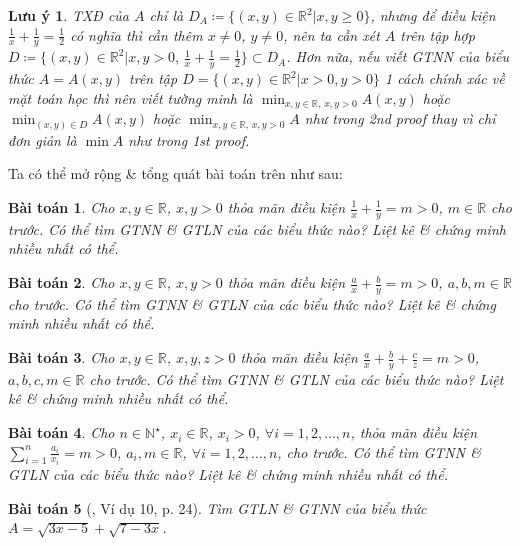 \documentclass{article}
\newtheorem{baitoan}{Bài toán}
\newtheorem{luuy}{Lưu ý}
\begin{document}
\begin{luuy}
	TXĐ của $A$ chỉ là $D_A\coloneqq\{(x,y)\in\mathbb{R}^2|x,y\ge0\}$, nhưng để điều kiện $\frac{1}{x} + \frac{1}{y} = \frac{1}{2}$ có nghĩa thì cần thêm $x\ne0$, $y\ne0$, nên ta cần xét $A$ trên tập hợp $D\coloneqq\{(x,y)\in\mathbb{R}^2|x,y > 0,\,\frac{1}{x} + \frac{1}{y} = \frac{1}{2}\}\subset D_A$. Hơn nữa, nếu viết {\rm GTNN} của biểu thức $A = A(x,y)$ trên tập $D = \{(x,y)\in\mathbb{R}^2|x > 0,y > 0\}$ 1 cách chính xác về mặt toán học thì nên viết tường minh là $\min_{x,y\in\mathbb{R},\,x,y > 0} A(x,y)$ hoặc $\min_{(x,y)\in D} A(x,y)$ hoặc $\min_{x,y\in\mathbb{R},\,x,y > 0} A$ như trong 2nd proof thay vì chỉ đơn giản là $\min A$ như trong 1st proof.
\end{luuy}
Ta có thể mở rộng \& tổng quát bài toán trên như sau:

\begin{baitoan}
	Cho $x,y\in\mathbb{R}$, $x,y > 0$ thỏa mãn điều kiện $\frac{1}{x} + \frac{1}{y} = m > 0$, $m\in\mathbb{R}$ cho trước. Có thể tìm {\rm GTNN} \& {\rm GTLN} của các biểu thức nào? Liệt kê \& chứng minh nhiều nhất có thể.
\end{baitoan}

\begin{baitoan}
	Cho $x,y\in\mathbb{R}$, $x,y > 0$ thỏa mãn điều kiện $\frac{a}{x} + \frac{b}{y} = m > 0$, $a,b,m\in\mathbb{R}$ cho trước. Có thể tìm {\rm GTNN} \& {\rm GTLN} của các biểu thức nào? Liệt kê \& chứng minh nhiều nhất có thể.
\end{baitoan}

\begin{baitoan}
	Cho $x,y\in\mathbb{R}$, $x,y,z > 0$ thỏa mãn điều kiện $\frac{a}{x} + \frac{b}{y} + \frac{c}{z} = m > 0$, $a,b,c,m\in\mathbb{R}$ cho trước. Có thể tìm {\rm GTNN} \& {\rm GTLN} của các biểu thức nào? Liệt kê \& chứng minh nhiều nhất có thể.
\end{baitoan}

\begin{baitoan}
	Cho $n\in\mathbb{N}^\star$, $x_i\in\mathbb{R}$, $x_i > 0$, $\forall i = 1,2,\ldots,n$, thỏa mãn điều kiện $\sum_{i=1}^n \frac{a_i}{x_i} = m > 0$, $a_i,m\in\mathbb{R}$, $\forall i = 1,2,\ldots,n$, cho trước. Có thể tìm {\rm GTNN} \& {\rm GTLN} của các biểu thức nào? Liệt kê \& chứng minh nhiều nhất có thể.
\end{baitoan}

\begin{baitoan}[\cite{Tuyen_Toan_9}, Ví dụ 10, p. 24]
	Tìm {\rm GTLN} \& {\rm GTNN} của biểu thức $A = \sqrt{3x - 5} + \sqrt{7 - 3x}$.
\end{baitoan}
\end{document}
